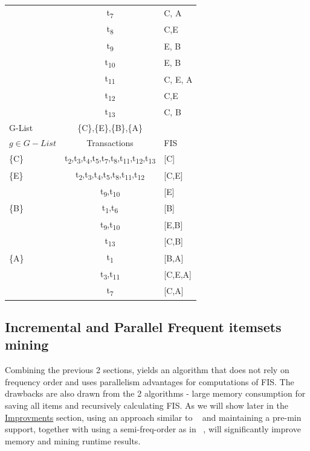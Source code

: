 \begin{table}[H]
\begin{center}
\begin{tabular}{l|c|l}
	   & t\textsubscript{7} & {C, A}\\
       & t\textsubscript{8} & {C,E}\\
        & t\textsubscript{9} &{E, B} \\
	   & t\textsubscript{10} & {E, B}\\
       & t\textsubscript{11} & {C, E, A}\\
        & t\textsubscript{12} & {C,E}\\
	   & t\textsubscript{13} & {C, B}\\
		\hline
	   G-List & \{C\},\{E\},\{B\},\{A\} &\\
		\hline
		$g\in G-List$ & Transactions & FIS\\
		\hline
		\{C\}& t\textsubscript{2},t\textsubscript{3},t\textsubscript{4},t\textsubscript{5},t\textsubscript{7},t\textsubscript{8},t\textsubscript{11},t\textsubscript{12},t\textsubscript{13}& [C]\\
		\{E\}& 		t\textsubscript{2},t\textsubscript{3},t\textsubscript{4},t\textsubscript{5},t\textsubscript{8},t\textsubscript{11},t\textsubscript{12} & [C,E]\\
		& t\textsubscript{9},t\textsubscript{10} & [E]\\
		\{B\} &t\textsubscript{1},t\textsubscript{6} & [B]\\
		&t\textsubscript{9},t\textsubscript{10} & [E,B]\\
		&t\textsubscript{13} & [C,B]\\
		\{A\} &t\textsubscript{1} & [B,A]\\
		&t\textsubscript{3},t\textsubscript{11} & [C,E,A]\\
		&t\textsubscript{7} & [C,A]\\
    \end{tabular}
  \end{center}
\end{table}

\subsection{Incremental and Parallel Frequent itemsets mining}
Combining the previous 2 sections, yields an algorithm that does not rely on frequency order and uses parallelism advantages for computations of FIS.
The drawbacks are also drawn from the 2 algorithms - large memory consumption for saving all items and recursively calculating FIS. As we will show later in the \hyperref[sec:improvements]{Improvments} section, using an approach similar to ~\cite{kohefficient} and maintaining a pre-min support, together with using a semi-freq-order as in ~\cite{tanbeer2009efficient}, will significantly improve memory and mining runtime results.



